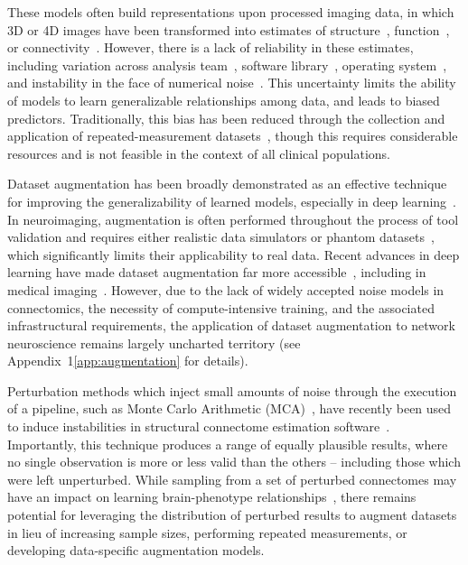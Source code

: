 \documentclass[num-refs]{nbdt-article}
\begin{document}
These models often build representations upon processed imaging data, in which 3D or 4D images have been transformed into estimates of structure~\cite{wade2017machine}, function~\cite{weis2020sex}, or connectivity~\cite{munsell2015evaluation}. However, there is a lack of reliability in these estimates, including variation across analysis team~\cite{botvinik2020variability}, software library~\cite{bowring2019exploring}, operating system~\cite{salari2020file}, and instability in the face of numerical noise~\cite{Kiar2020-kz}. This uncertainty limits the ability of models to learn generalizable relationships among data, and leads to biased predictors. Traditionally, this bias has been reduced through the collection and application of repeated-measurement datasets~\cite{sudlow2015uk,zuo2014open}, though this requires considerable resources and is not feasible in the context of all clinical populations.

Dataset augmentation has been broadly demonstrated as an effective technique for improving the generalizability of learned models, especially in deep learning~\cite{nalepa2019data}. In neuroimaging, augmentation is often performed throughout the process of tool validation and requires either realistic data simulators or phantom datasets~\cite{graham2016realistic}, which significantly limits their applicability to real data. Recent advances in deep learning have made dataset augmentation far more accessible~\cite{shorten2019survey}, including in medical imaging~\cite{yi2019generative,barile2021data}. However, due to the lack of widely accepted noise models in connectomics, the necessity of compute-intensive training, and the associated infrastructural requirements, the application of dataset augmentation to network neuroscience remains largely uncharted territory (see Appendix~1\ref{app:augmentation} for details).

Perturbation methods which inject small amounts of noise through the execution of a pipeline, such as Monte Carlo Arithmetic (MCA)~\cite{Parker1997-qq,Denis2016-wo}, have recently been used to induce instabilities in structural connectome estimation software~\cite{Kiar2020-lb}. Importantly, this technique produces a range of equally plausible results, where no single observation is more or less valid than the others – including those which were left unperturbed. While sampling from a set of perturbed connectomes may have an impact on learning brain-phenotype relationships~\cite{Kiar2020-kz}, there remains potential for leveraging the distribution of perturbed results to augment datasets in lieu of increasing sample sizes, performing repeated measurements, or developing data-specific augmentation models.
\end{document}
